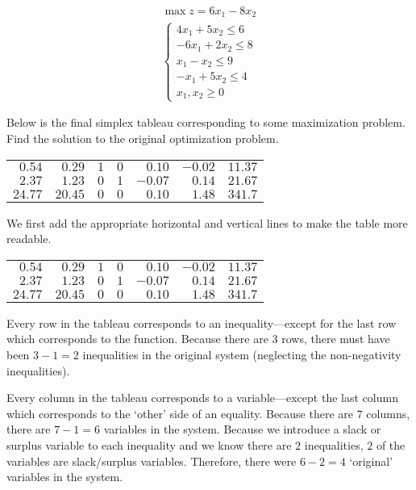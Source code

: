\documentclass[12pt,letterpaper]{exam}
\begin{document}
\begin{questions}
	\[
	\begin{gathered}
	\max z= 6x_1 - 8x_2 \\
	\begin{cases}
	4x_1+ 5x_2 \leq 6 \\
	-6x_1 + 2x_2 \leq 8 \\
	x_1 - x_2 \leq 9 \\
	-x_1 + 5x_2 \leq 4 \\
	x_1, x_2 \geq 0
	\end{cases}
	\end{gathered}
	\] 



\newpage
\question[10] Below is the final simplex tableau corresponding to some maximization problem. Find the solution to the original optimization problem. \par
	\begin{table}[!ht]
	\centering
	\begin{tabular}{rrrrrrr}
	$0.54$ & $0.29$ & $1$ & $0$ & $0.10$ & $-0.02$ & $11.37$ \\
	$2.37$ & $1.23$ & $0$ & $1$ & $-0.07$ & $0.14$ & $21.67$ \\
	$24.77$ & $20.45$ & $0$ & $0$& $0.10$ & $1.48$ & $341.7$
	\end{tabular}
	\end{table} \par

\sol We first add the appropriate horizontal and vertical lines to make the table more readable. \par 
	\begin{table}[!ht]
	\centering
	\begin{tabular}{rrrrrr|r}
	$0.54$ & $0.29$ & $1$ & $0$ & $0.10$ & $-0.02$ & $11.37$ \\
	$2.37$ & $1.23$ & $0$ & $1$ & $-0.07$ & $0.14$ & $21.67$ \\ \hline
	$24.77$ & $20.45$ & $0$ & $0$& $0.10$ & $1.48$ & $341.7$
	\end{tabular}
	\end{table} \par
Every row in the tableau corresponds to an inequality---except for the last row which corresponds to the function. Because there are $3$ rows, there must have been $3 - 1= 2$ inequalities in the original system (neglecting the non-negativity inequalities). \pspace

Every column in the tableau corresponds to a variable---except the last column which corresponds to the `other' side of an equality. Because there are $7$ columns, there are $7 - 1= 6$ variables in the system. Because we introduce a slack or surplus variable to each inequality and we know there are $2$ inequalities, $2$ of the variables are slack/surplus variables. Therefore, there were $6 - 2= 4$ `original' variables in the system. \pspace


\end{questions}
\end{document}
